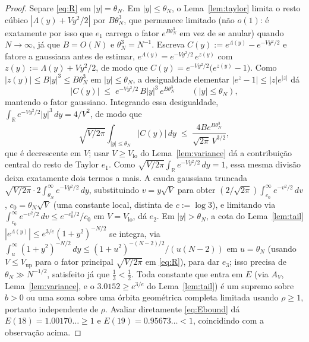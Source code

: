 \documentclass[11pt]{amsart}
\theoremstyle{plain}
\theoremstyle{definition}
\theoremstyle{remark}
\newcommand{\R}{\mathbb{R}}
\begin{document}
\begin{proof}
Separe \eqref{eq:R} em $|y|=\theta_N$. Em $|y|\le\theta_N$, o Lema~\ref{lem:taylor} limita o resto
cúbico $|\Lambda(y)+Vy^2/2|$ por $B\theta_N^3$, que permanece limitado (não $o(1)$: é exatamente por
isso que $e_1$ carrega o fator $e^{B\theta_N^3}$ em vez de se anular) quando $N\to\infty$, já que
$B=O(N)$ e $\theta_N^3=N^{-1}$. Escreva $C(y):=e^{\Lambda(y)}-e^{-Vy^2/2}$ e fatore a gaussiana antes
de estimar, $e^{\Lambda(y)} = e^{-Vy^2/2}\,e^{z(y)}$ com $z(y) := \Lambda(y)+Vy^2/2$, de modo que
$C(y) = e^{-Vy^2/2}\bigl(e^{z(y)}-1\bigr)$. Como $|z(y)|\le B|y|^3 \le B\theta_N^3$ em
$|y|\le\theta_N$, a desigualdade elementar $|e^z-1|\le|z|e^{|z|}$ dá
\[
|C(y)| \;\le\; e^{-Vy^2/2}\,B|y|^3\,e^{B\theta_N^3} \qquad (|y|\le\theta_N),
\]
mantendo o fator gaussiano. Integrando essa desigualdade, $\int_\R e^{-Vy^2/2}|y|^3\,dy=4/V^2$, de
modo que
\[
\sqrt{V/2\pi}\int_{|y|\le\theta_N}|C(y)|\,dy \;\le\; \frac{4Be^{B\theta_N^3}}{\sqrt{2\pi}\,V^{3/2}},
\]
que é decrescente em $V$; usar $V\ge V_{\mathrm{lo}}$ do Lema~\ref{lem:variance} dá a contribuição
central do resto de Taylor $e_1$. Como $\sqrt{V/2\pi}\int_\R e^{-Vy^2/2}\,dy = 1$, essa mesma divisão
deixa exatamente dois termos a mais. A cauda gaussiana truncada
$\sqrt{V/2\pi}\cdot2\int_{\theta_N}^\infty e^{-Vy^2/2}\,dy$, substituindo $v=y\sqrt V$ para obter
$(2/\sqrt{2\pi})\int_{c_0}^\infty e^{-v^2/2}\,dv$, $c_0=\theta_N\sqrt V$ (uma constante local,
distinta de $c:=\log3$), e limitando via $\int_{c_0}^\infty e^{-v^2/2}\,dv\le e^{-c_0^2/2}/c_0$ em
$V=V_{\mathrm{lo}}$, dá $e_2$. Em $|y|>\theta_N$, a cota do Lema~\ref{lem:tail}
$|e^{\Lambda(y)}|\le e^{3/e}(1+y^2)^{-N/2}$ se integra, via $\int_u^\infty(1+y^2)^{-N/2}\,dy \le
(1+u^2)^{-(N-2)/2}/(u(N-2))$ em $u=\theta_N$ (usando $V\le V_{\mathrm{up}}$ para o fator principal
$\sqrt{V/2\pi}$ em \eqref{eq:R}), para dar $e_3$; isso precisa de $\theta_N \gg N^{-1/2}$, satisfeito
já que $\tfrac13<\tfrac12$. Toda constante que entra em $E$ (via $A_V$, Lema~\ref{lem:variance}, e o
$3.0152\ge e^{3/e}$ do Lema~\ref{lem:tail}) é um supremo sobre $b>0$ ou uma soma sobre uma órbita
geométrica completa limitada usando $\rho\ge1$, portanto independente de $\rho$. Avaliar
diretamente \eqref{eq:Ebound} dá $E(18) = 1.00170\ldots \ge 1$ e $E(19) = 0.95673\ldots < 1$,
coincidindo com a observação acima.


\end{proof}
\end{document}
